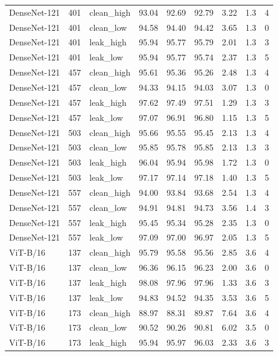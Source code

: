 {\begin{longtable}{lrlrrrrrr}
DenseNet-121 & 401 & clean\_high & 93.04 & 92.69 & 92.79 & 3.22 & 1.3 & 4 \\
DenseNet-121 & 401 & clean\_low & 94.58 & 94.40 & 94.42 & 3.65 & 1.3 & 0 \\
DenseNet-121 & 401 & leak\_high & 95.94 & 95.77 & 95.79 & 2.01 & 1.3 & 3 \\
DenseNet-121 & 401 & leak\_low & 95.94 & 95.77 & 95.74 & 2.37 & 1.3 & 5 \\
DenseNet-121 & 457 & clean\_high & 95.61 & 95.36 & 95.26 & 2.48 & 1.3 & 4 \\
DenseNet-121 & 457 & clean\_low & 94.33 & 94.15 & 94.03 & 3.07 & 1.3 & 0 \\
DenseNet-121 & 457 & leak\_high & 97.62 & 97.49 & 97.51 & 1.29 & 1.3 & 3 \\
DenseNet-121 & 457 & leak\_low & 97.07 & 96.91 & 96.80 & 1.15 & 1.3 & 5 \\
DenseNet-121 & 503 & clean\_high & 95.66 & 95.55 & 95.45 & 2.13 & 1.3 & 4 \\
DenseNet-121 & 503 & clean\_low & 95.85 & 95.78 & 95.85 & 2.13 & 1.3 & 3 \\
DenseNet-121 & 503 & leak\_high & 96.04 & 95.94 & 95.98 & 1.72 & 1.3 & 0 \\
DenseNet-121 & 503 & leak\_low & 97.17 & 97.14 & 97.18 & 1.40 & 1.3 & 5 \\
DenseNet-121 & 557 & clean\_high & 94.00 & 93.84 & 93.68 & 2.54 & 1.3 & 4 \\
DenseNet-121 & 557 & clean\_low & 94.91 & 94.81 & 94.73 & 3.56 & 1.4 & 3 \\
DenseNet-121 & 557 & leak\_high & 95.45 & 95.34 & 95.28 & 2.35 & 1.3 & 0 \\
DenseNet-121 & 557 & leak\_low & 97.09 & 97.00 & 96.97 & 2.05 & 1.3 & 5 \\
ViT-B/16 & 137 & clean\_high & 95.79 & 95.58 & 95.56 & 2.85 & 3.6 & 4 \\
ViT-B/16 & 137 & clean\_low & 96.36 & 96.15 & 96.23 & 2.00 & 3.6 & 0 \\
ViT-B/16 & 137 & leak\_high & 98.08 & 97.96 & 97.96 & 1.33 & 3.6 & 3 \\
ViT-B/16 & 137 & leak\_low & 94.83 & 94.52 & 94.35 & 3.53 & 3.6 & 5 \\
ViT-B/16 & 173 & clean\_high & 88.97 & 88.31 & 89.87 & 7.64 & 3.6 & 4 \\
ViT-B/16 & 173 & clean\_low & 90.52 & 90.26 & 90.81 & 6.02 & 3.5 & 0 \\
ViT-B/16 & 173 & leak\_high & 95.94 & 95.97 & 96.03 & 2.33 & 3.6 & 3 \\

\end{longtable}}
